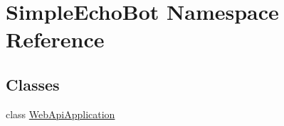 \hypertarget{namespace_simple_echo_bot}{}\section{Simple\+Echo\+Bot Namespace Reference}
\label{namespace_simple_echo_bot}
\subsection*{Classes}
\begin{DoxyCompactItemize}
\item 
class \hyperlink{class_simple_echo_bot_1_1_web_api_application}{Web\+Api\+Application}
\end{DoxyCompactItemize}
